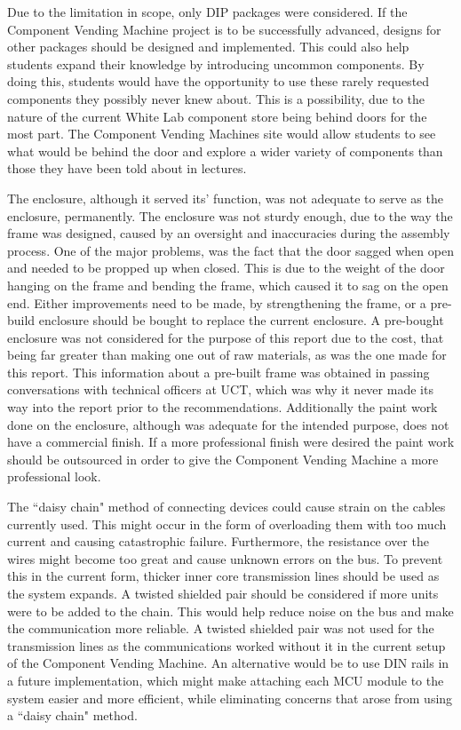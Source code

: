 \documentclass[a4paper,11pt]{article}
\numberwithin{figure}{section}
\numberwithin{table}{section}
\begin{document}
Due to the limitation in scope, only DIP packages were considered. If the Component Vending Machine project is to be successfully advanced, designs for other packages should be designed and implemented. This could also help students expand their knowledge by introducing uncommon components. By doing this, students would have the opportunity to use these rarely requested components they possibly never knew about. This is a possibility, due to the nature of the current White Lab component store being behind doors for the most part. The Component Vending Machines site would allow students to see what would be behind the door and explore a wider variety of components than those they have been told about in lectures.

The enclosure, although it served its' function, was not adequate to serve as the enclosure, permanently. The enclosure was not sturdy enough, due to the way the frame was designed, caused by an oversight and inaccuracies during the assembly process. One of the major problems, was the fact that the door sagged when open and needed to be propped up when closed. This is due to the weight of the door hanging on the frame and bending the frame, which caused it to sag on the open end. Either improvements need to be made, by strengthening the frame, or a pre-build enclosure should be bought to replace the current enclosure. A pre-bought enclosure was not considered for the purpose of this report due to the cost, that being far greater than making one out of raw materials, as was the one made for this report. This information about a pre-built frame was obtained in passing conversations with technical officers at UCT, which was why it never made its way into the report prior to the recommendations. Additionally the paint work done on the enclosure, although was adequate for the intended purpose, does not have a commercial finish. If a more professional finish were desired the paint work should be outsourced in order to give the Component Vending Machine a more professional look.

The ``daisy chain" method of connecting devices could cause strain on the cables currently used. This might occur in the form of overloading them with too much current and causing catastrophic failure. Furthermore, the resistance over the wires might become too great and cause unknown errors on the bus. To prevent this in the current form, thicker inner core transmission lines should be used as the system expands. A twisted shielded pair should be considered if more units were to be added to the chain. This would help reduce noise on the bus and make the communication more reliable. A twisted shielded pair was not used for the transmission lines as the communications worked without it in the current setup of the Component Vending Machine. An alternative would be to use DIN rails in a future implementation, which might make attaching each MCU module to the system easier and more efficient, while eliminating concerns that arose from using a ``daisy chain" method.
\end{document}

